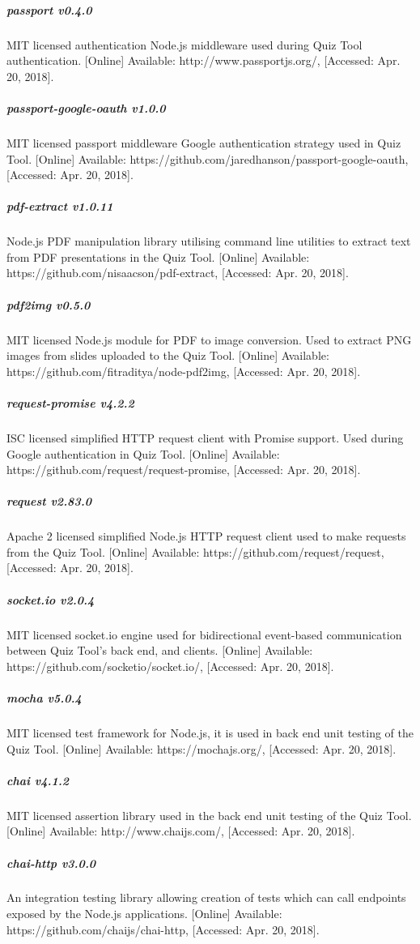 \subparagraph{passport v0.4.0}
MIT licensed authentication Node.js middleware used during Quiz Tool authentication.
[Online] Available: http://www.passportjs.org/, [Accessed: Apr. 20, 2018].

\subparagraph{passport-google-oauth v1.0.0}
MIT licensed passport middleware Google authentication strategy used in Quiz Tool.
[Online] Available: https://github.com/jaredhanson/passport-google-oauth, [Accessed: Apr. 20, 2018].

\subparagraph{pdf-extract v1.0.11}
Node.js PDF manipulation library utilising command line utilities to extract text from PDF
presentations in the Quiz Tool. [Online] Available: https://github.com/nisaacson/pdf-extract, [Accessed: Apr. 20, 2018].

\subparagraph{pdf2img v0.5.0}
MIT licensed Node.js module for PDF to image conversion. Used to extract PNG images from slides uploaded
to the Quiz Tool. [Online] Available: https://github.com/fitraditya/node-pdf2img, [Accessed: Apr. 20, 2018].

\subparagraph{request-promise v4.2.2}
ISC licensed simplified HTTP request client with Promise support. Used during Google authentication in Quiz Tool.
[Online] Available: https://github.com/request/request-promise, [Accessed: Apr. 20, 2018].

\subparagraph{request v2.83.0}
Apache 2 licensed simplified Node.js HTTP request client used to make requests from the Quiz Tool.
[Online] Available: https://github.com/request/request, [Accessed: Apr. 20, 2018].

\subparagraph{socket.io v2.0.4}
MIT licensed socket.io engine used for bidirectional event-based communication between Quiz Tool's
back end, and clients. [Online] Available: https://github.com/socketio/socket.io/, [Accessed: Apr. 20, 2018].

\subparagraph{mocha v5.0.4}
MIT licensed test framework for Node.js, it is used in back end unit testing of the Quiz Tool.
 [Online] Available: https://mochajs.org/, [Accessed: Apr. 20, 2018].

\subparagraph{chai v4.1.2}
MIT licensed assertion library used in the back end unit testing of the Quiz Tool.
 [Online] Available: http://www.chaijs.com/, [Accessed: Apr. 20, 2018].

\subparagraph{chai-http v3.0.0}
An integration testing library allowing creation of tests which can call endpoints
exposed by the Node.js applications.  [Online] Available: https://github.com/chaijs/chai-http, [Accessed: Apr. 20, 2018].

